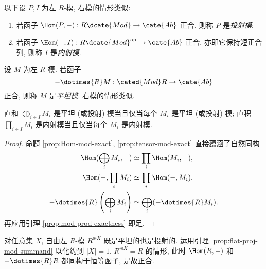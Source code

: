 \begin{definition}\label{def:inj-proj-modules}
	以下设 $P, I$ 为左 $R$-模, 右模的情形类似:
	\begin{enumerate}
		\item 若函子 $\Hom(P, -): R\dcate{Mod} \to \cate{Ab}$ 正合, 则称 $P$ 是\emph{投射模};
		\item 若函子 $\Hom(-, I): R\dcate{Mod}^\text{op} \to \cate{Ab}$ 正合, 亦即它保持短正合列, 则称 $I$ 是\emph{内射模}.
	\end{enumerate}
\end{definition}

\begin{definition}
	设 $M$ 为左 $R$-模. 若函子
	\[ - \dotimes{R} M: \cated{Mod}R \to \cate{Ab} \]
	正合, 则称 $M$ 是\emph{平坦模}. 右模的情形类似.
\end{definition}

\begin{lemma}\label{prop:flat-proj-mod-summand}
	直和 $\bigoplus_{i \in I} M_i$ 是平坦 (或投射) 模当且仅当每个 $M_i$ 是平坦 (或投射) 模; 直积 $\prod_{i \in I} M_i$ 是内射模当且仅当每个 $M_i$ 是内射模.
\end{lemma}
\begin{proof}
	命题 \ref{prop:Hom-mod-exact}, \ref{prop:tensor-mod-exact} 直接蕴涵了自然同构
	\begin{align*}
		\Hom(\bigoplus_i M_i, -) & \simeq \prod_i \Hom(M_i, -), \\
		\Hom(-, \prod_i M_i) & \simeq \prod_i \Hom(-, M_i), \\
		- \dotimes{R} \left( \bigoplus_i M_i \right) & \simeq \bigoplus_i (- \dotimes{R} M_i).
	\end{align*}
	再应用引理 \ref{prop:mod-prod-exactness} 即足.
\end{proof}

\begin{example}\label{eg:flat-proj-freemod}
	对任意集 $X$, 自由左 $R$-模 $R^{\oplus X}$ 既是平坦的也是投射的. 运用引理 \ref{prop:flat-proj-mod-summand} 以化约到 $|X|=1$, $R^{\oplus X} = R$ 的情形, 此时 $\Hom(R,-)$ 和 $- \dotimes{R} R$ 都同构于恒等函子, 是故正合.
\end{example}

